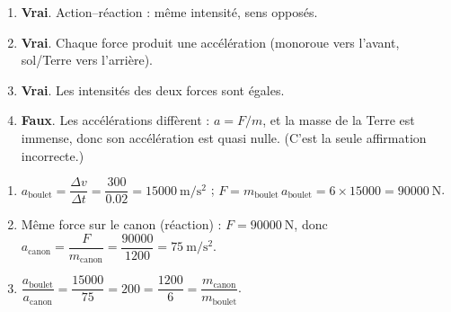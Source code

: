 \documentclass[11pt,a4paper]{article}
\begin{document}
\begin{corrige}
\begin{enumerate}[label=\Alph*.]
  \item \textbf{Vrai}. Action--réaction : même intensité, sens opposés.
  \item \textbf{Vrai}. Chaque force produit une accélération (monoroue vers l'avant, sol/Terre vers l'arrière).
  \item \textbf{Vrai}. Les intensités des deux forces sont égales.
  \item \textbf{Faux}. Les accélérations diffèrent : $a=F/m$, et la masse de la Terre est immense, donc
        son accélération est quasi nulle. (C'est la seule affirmation incorrecte.)
\end{enumerate}
\end{corrige}

\begin{corrige}
\begin{enumerate}[label=\alph*)]
  \item $a_{\text{boulet}}=\dfrac{\Delta v}{\Delta t}=\dfrac{300}{\num{0,02}}=\qty{15000}{\metre\per\second\squared}$ ;
        $F=m_{\text{boulet}}\,a_{\text{boulet}}=6\times15000=\qty{90000}{\newton}$.
  \item Même force sur le canon (réaction) : $F=\qty{90000}{\newton}$, donc
        $a_{\text{canon}}=\dfrac{F}{m_{\text{canon}}}=\dfrac{90000}{1200}=\qty{75}{\metre\per\second\squared}$.
  \item $\dfrac{a_{\text{boulet}}}{a_{\text{canon}}}=\dfrac{15000}{75}=200=\dfrac{1200}{6}=\dfrac{m_{\text{canon}}}{m_{\text{boulet}}}$. \checkmark
\end{enumerate}
\end{corrige}
\end{document}
